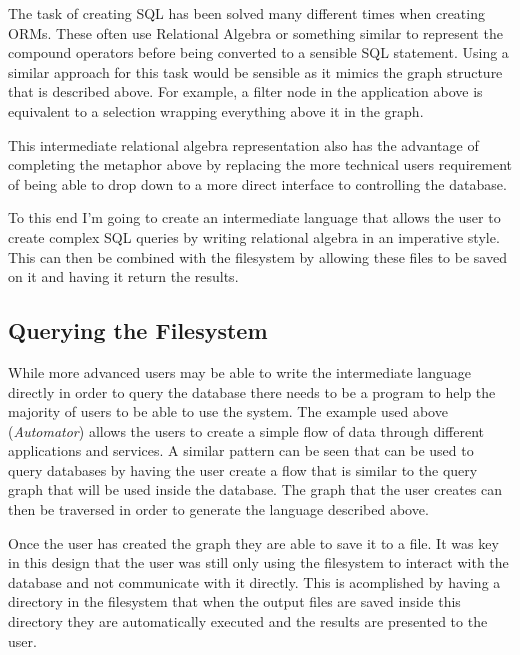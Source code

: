 The task of creating \ac{SQL} has been solved many different times when
creating \acp{ORM}. These often use Relational Algebra or something similar to
represent the compound operators before being converted to a sensible SQL
statement. Using a similar approach for this task would be sensible as it
mimics the graph structure that is described above. For example, a filter node
in the application above is equivalent to a selection wrapping everything above
it in the graph.

This intermediate relational algebra representation also has the advantage of
completing the metaphor above by replacing the more technical users requirement
of being able to drop down to a more direct interface to controlling the
database.

To this end I'm going to create an intermediate language that allows the user
to create complex \ac{SQL} queries by writing relational algebra in an
imperative style. This can then be combined with the filesystem by allowing
these files to be saved on it and having it return the results.

\subsection{Querying the Filesystem}

While more advanced users may be able to write the intermediate language
directly in order to query the database there needs to be a program to help the
majority of users to be able to use the system. The example used above
(\emph{Automator}) allows the users to create a simple flow of data through
different applications and services. A similar pattern can be seen that can be
used to query databases by having the user create a flow that is similar to the
query graph that will be used inside the database. The graph that the user
creates can then be traversed in order to generate the language described
above.

Once the user has created the graph they are able to save it to a file. It was
key in this design that the user was still only using the filesystem to interact
with the database and not communicate with it directly. This is acomplished by
having a directory in the filesystem that when the output files are saved
inside this directory they are automatically executed and the results are
presented to the user.
